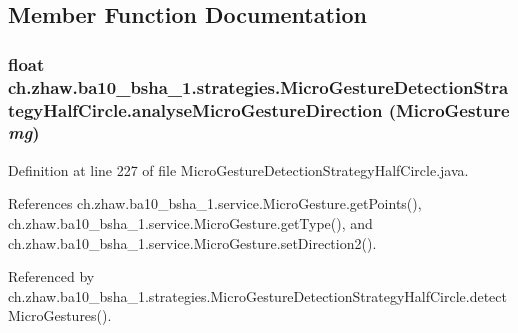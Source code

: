 \subsection{Member Function Documentation}
\hypertarget{classch_1_1zhaw_1_1ba10__bsha__1_1_1strategies_1_1MicroGestureDetectionStrategyHalfCircle_abc630df3a07afe93dacdc0fc3c788607}{
\subsubsection[{analyseMicroGestureDirection}]{\setlength{\rightskip}{0pt plus 5cm}float ch.zhaw.ba10\_\-bsha\_\-1.strategies.MicroGestureDetectionStrategyHalfCircle.analyseMicroGestureDirection ({\bf MicroGesture} {\em mg})}}
\label{classch_1_1zhaw_1_1ba10__bsha__1_1_1strategies_1_1MicroGestureDetectionStrategyHalfCircle_abc630df3a07afe93dacdc0fc3c788607}


Definition at line 227 of file MicroGestureDetectionStrategyHalfCircle.java.

References ch.zhaw.ba10\_\-bsha\_\-1.service.MicroGesture.getPoints(), ch.zhaw.ba10\_\-bsha\_\-1.service.MicroGesture.getType(), and ch.zhaw.ba10\_\-bsha\_\-1.service.MicroGesture.setDirection2().

Referenced by ch.zhaw.ba10\_\-bsha\_\-1.strategies.MicroGestureDetectionStrategyHalfCircle.detectMicroGestures().

